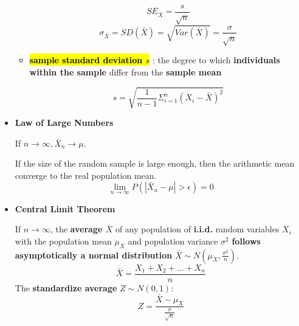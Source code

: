 \begin{itemize}
\begin{itemize}
		$$SE_{\bar{X}} = \frac{s}{\sqrt{n}}$$
		$$\sigma_{\bar{X}} = SD(\bar{X}) = \sqrt{Var(\bar{X})} = \frac{\sigma}{\sqrt{n}}$$
		
		\item\hl{\textbf{sample standard deviation $s$}} : the degree to which \textbf{individuals within the sample} differ from the \textbf{sample mean}
		
		$$s = \sqrt{\frac{1}{n-1} \Sigma_{i=1}^{n} (X_i - \bar{X})^2}$$
	\end{itemize}
	
	\item \textbf{Law of Large Numbers}
	
	If $n \rightarrow \infty, \bar{X}_n \rightarrow \mu$. 
	
	If the size of the random sample is large enough, then the arithmetic mean converge to the real population mean.  
	$$\lim\limits_{n\rightarrow \infty} P(|\bar{X}_n - \mu| > \epsilon) = 0$$
	
	\item \textbf{Central Limit Theorem}
	
	If \textbf{$n \rightarrow \infty$}, the \textbf{average $\bar{X}$} of any population of \textbf{i.i.d.} random variables $X_i$ with the population mean $\mu_X$ and population variance $\sigma^2$ \textbf{follows asymptotically a normal distribution} $\bar{X} \sim N(\mu_X, \frac{\sigma^2}{n})$. 
	$$\bar{X} = \frac{X_1 + X_2 + \dots + X_n}{n}$$
	The \textbf{standardize average} $Z \sim N(0,1)$: $$Z = \frac{\bar{X} - \mu_X}{\frac{\sigma}{\sqrt{n}}}$$
\end{itemize}

